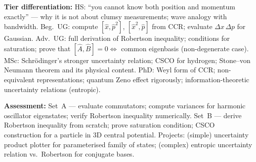 \documentclass[11pt,a4paper]{article}
\begin{document}
\begin{tcolorbox}[modulebox, title={Module~I.3 / L03: Uncertainty and Commutation Relations}]
\medskip\textbf{Tier differentiation:}
HS: ``you cannot know both position and momentum exactly'' --- why it is not
about clumsy measurements; wave analogy with bandwidth.
Beg.\ UG: compute $[\hat{x},\hat{p}^2]$, $[\hat{x}^2,\hat{p}]$ from CCR;
evaluate $\Delta x\,\Delta p$ for Gaussian.
Adv.\ UG: full derivation of Robertson inequality; conditions for saturation;
prove that $[\hat{A},\hat{B}]=0 \Leftrightarrow$ common eigenbasis (non-degenerate case).
MSc: Schr\"odinger's stronger uncertainty relation; CSCO for hydrogen;
Stone--von Neumann theorem and its physical content.
PhD: Weyl form of CCR; non-equivalent representations; quantum Zeno effect
rigorously; information-theoretic uncertainty relations (entropic).

\medskip\textbf{Assessment:}
Set~A --- evaluate commutators; compute variances for harmonic oscillator eigenstates;
verify Robertson inequality numerically.
Set~B --- derive Robertson inequality from scratch; prove saturation condition;
CSCO construction for a particle in 3D central potential.
Projects: (simple) uncertainty product plotter for parameterised family of states;
(complex) entropic uncertainty relation vs.\ Robertson for conjugate bases.
\end{tcolorbox}
\end{document}
